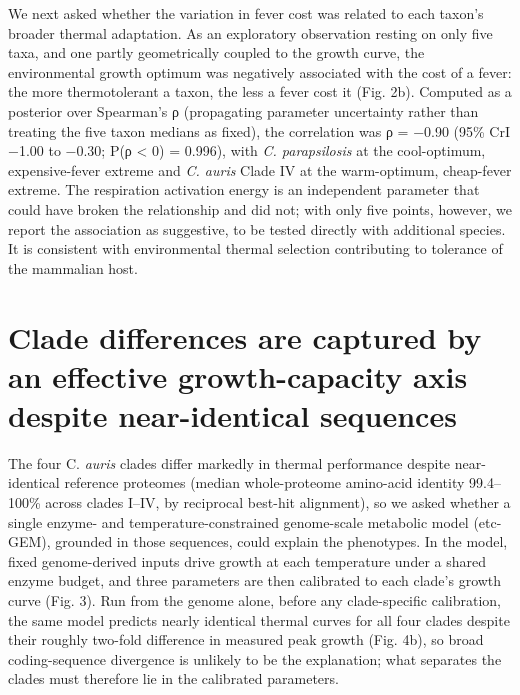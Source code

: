 \documentclass[
]{article}
\begin{document}
We next asked whether the variation in fever cost was related to each
taxon's broader thermal adaptation. As an exploratory observation
resting on only five taxa, and one partly geometrically coupled to the
growth curve, the environmental growth optimum was negatively associated
with the cost of a fever: the more thermotolerant a taxon, the less a
fever cost it (Fig. 2b). Computed as a posterior over Spearman's ρ
(propagating parameter uncertainty rather than treating the five taxon
medians as fixed), the correlation was ρ = −0.90 (95\% CrI −1.00 to
−0.30; P(ρ \textless{} 0) = 0.996), with \emph{C. parapsilosis} at the
cool-optimum, expensive-fever extreme and \emph{C. auris} Clade IV at
the warm-optimum, cheap-fever extreme. The respiration activation energy
is an independent parameter that could have broken the relationship and
did not; with only five points, however, we report the association as
suggestive, to be tested directly with additional species. It is
consistent with environmental thermal selection contributing to
tolerance of the mammalian host.

\section{\texorpdfstring{\textbf{Clade differences are captured by an
effective growth-capacity axis despite near-identical
sequences}}{Clade differences are captured by an effective growth-capacity axis despite near-identical sequences}}\label{clade-differences-are-captured-by-an-effective-growth-capacity-axis-despite-near-identical-sequences}

The four C. \emph{auris} clades differ markedly in thermal performance
despite near-identical reference proteomes (median whole-proteome
amino-acid identity 99.4--100\% across clades I--IV, by reciprocal
best-hit alignment), so we asked whether a single enzyme- and
temperature-constrained genome-scale metabolic model (etc-GEM), grounded
in those sequences, could explain the phenotypes. In the model, fixed
genome-derived inputs drive growth at each temperature under a shared
enzyme budget, and three parameters are then calibrated to each clade's
growth curve (Fig. 3). Run from the genome alone, before any
clade-specific calibration, the same model predicts nearly identical
thermal curves for all four clades despite their roughly two-fold
difference in measured peak growth (Fig. 4b), so broad coding-sequence
divergence is unlikely to be the explanation; what separates the clades
must therefore lie in the calibrated parameters.
\end{document}
